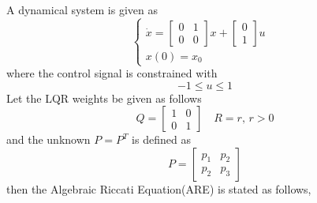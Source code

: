 A dynamical system is given as
\begin{equation}
    \begin{cases}
    \dot{x}=
    \begin{bmatrix}
        0& 1\\0& 0
    \end{bmatrix}
    x+
    \begin{bmatrix}
        0\\1
    \end{bmatrix}u&\\
    x(0)=x_0&
    \end{cases}
\end{equation}
where the control signal is constrained with 
\begin{equation}
    -1\leq u\leq 1
\end{equation}
Let the LQR weights be given as follows
\begin{equation}
    Q=\begin{bmatrix}
        1& 0\\0& 1
    \end{bmatrix}\quad R=r,\,r>0
\end{equation}
and the unknown $P=P^T$ is defined as
\begin{equation}
    P=\begin{bmatrix}
        p_1& p_2\\p_2& p_3
    \end{bmatrix}
\end{equation}
then the Algebraic Riccati Equation(ARE) is stated as follows,
